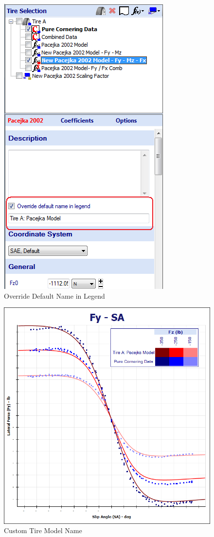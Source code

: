 \begin{figure}[H]
	\centering
		\includegraphics{LegendName.png}
	\caption{Override Default Name in Legend}
	\label{fig:LegendName}
\end{figure}

\begin{figure}[H]
	\centering
		\includegraphics[width=1.0\textwidth]{CustomLegendNames.png}
	\caption{Custom Tire Model Name}
	\label{fig:CustomLegendNames}
\end{figure}

